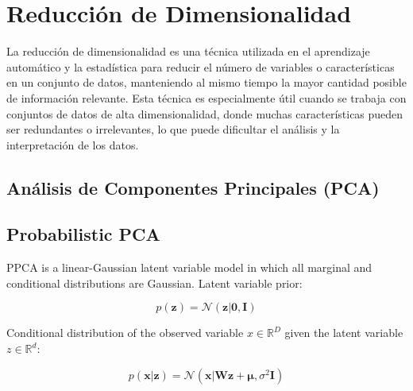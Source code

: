 \section{Reducción de Dimensionalidad}


La reducción de dimensionalidad es una técnica utilizada en el aprendizaje automático y la estadística para reducir el número de variables o características en un conjunto de datos, manteniendo al mismo tiempo la mayor cantidad posible de información relevante. Esta técnica es especialmente útil cuando se trabaja con conjuntos de datos de alta dimensionalidad, donde muchas características pueden ser redundantes o irrelevantes, lo que puede dificultar el análisis y la interpretación de los datos.

\subsection{Análisis de Componentes Principales (PCA)}


\subsection{Probabilistic PCA}

PPCA is a linear-Gaussian latent variable model in which all marginal and conditional distributions are Gaussian. Latent variable prior:

\[p(\boldsymbol{z})=\mathcal{N}(\boldsymbol{z}|\boldsymbol{0},\boldsymbol{I})\]

Conditional distribution of the observed variable \(x\in\mathbb{R}^D\) given the latent variable \(z\in\mathbb{R}^d\):

\[p(\boldsymbol{x}|\boldsymbol{z})=\mathcal{N}(\boldsymbol{x}|\boldsymbol{Wz}+\boldsymbol{\mu},\sigma^2\boldsymbol{I})\]